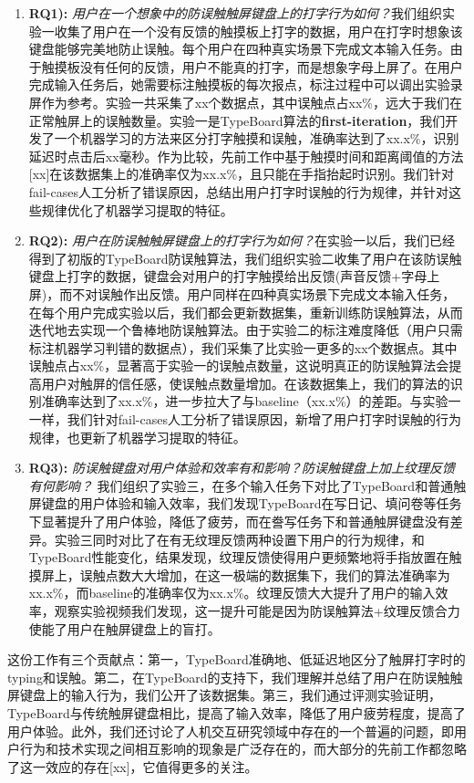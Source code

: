 \begin{enumerate}
	\item{\textbf{RQ1):} \emph{用户在一个想象中的防误触触屏键盘上的打字行为如何？}我们组织实验一收集了用户在一个没有反馈的触摸板上打字的数据，用户在打字时想象该键盘能够完美地防止误触。每个用户在四种真实场景下完成文本输入任务。由于触摸板没有任何的反馈，用户不能真的打字，而是想象字母上屏了。在用户完成输入任务后，她需要标注触摸板的每次报点，标注过程中可以调出实验录屏作为参考。实验一共采集了xx个数据点，其中误触点占xx\%，远大于我们在正常触屏上的误触数量。实验一是TypeBoard算法的\textbf{first-iteration}，我们开发了一个机器学习的方法来区分打字触摸和误触，准确率达到了xx.x\%，识别延迟时点击后xx毫秒。作为比较，先前工作中基于触摸时间和距离阈值的方法[xx]在该数据集上的准确率仅为xx.x\%，且只能在手指抬起时识别。我们针对fail-cases人工分析了错误原因，总结出用户打字时误触的行为规律，并针对这些规律优化了机器学习提取的特征。}
	\item{\textbf{RQ2):} \emph{用户在防误触触屏键盘上的打字行为如何？}在实验一以后，我们已经得到了初版的TypeBoard防误触算法，我们组织实验二收集了用户在该防误触键盘上打字的数据，键盘会对用户的打字触摸给出反馈(声音反馈+字母上屏)，而不对误触作出反馈。用户同样在四种真实场景下完成文本输入任务，在每个用户完成实验以后，我们都会更新数据集，重新训练防误触算法，从而迭代地去实现一个鲁棒地防误触算法。由于实验二的标注难度降低（用户只需标注机器学习判错的数据点），我们采集了比实验一更多的xx个数据点。其中误触点占xx\%，显著高于实验一的误触点数量，这说明真正的防误触算法会提高用户对触屏的信任感，使误触点数量增加。在该数据集上，我们的算法的识别准确率达到了xx.x\%，进一步拉大了与baseline（xx.x\%）的差距。与实验一一样，我们针对fail-cases人工分析了错误原因，新增了用户打字时误触的行为规律，也更新了机器学习提取的特征。}
	\item{\textbf{RQ3):} \emph{防误触键盘对用户体验和效率有和影响？防误触键盘上加上纹理反馈有何影响？} 我们组织了实验三，在多个输入任务下对比了TypeBoard和普通触屏键盘的用户体验和输入效率，我们发现TypeBoard在写日记、填问卷等任务下显著提升了用户体验，降低了疲劳，而在誊写任务下和普通触屏键盘没有差异。实验三同时对比了在有无纹理反馈两种设置下用户的行为规律，和TypeBoard性能变化，结果发现，纹理反馈使得用户更频繁地将手指放置在触摸屏上，误触点数大大增加，在这一极端的数据集下，我们的算法准确率为xx.x\%，而baseline的准确率仅为xx.x\%。纹理反馈大大提升了用户的输入效率，观察实验视频我们发现，这一提升可能是因为防误触算法+纹理反馈合力使能了用户在触屏键盘上的盲打。}
\end{enumerate}

这份工作有三个贡献点：第一，TypeBoard准确地、低延迟地区分了触屏打字时的typing和误触。第二，在TypeBoard的支持下，我们理解并总结了用户在防误触触屏键盘上的输入行为，我们公开了该数据集。第三，我们通过评测实验证明，TypeBoard与传统触屏键盘相比，提高了输入效率，降低了用户疲劳程度，提高了用户体验。此外，我们还讨论了人机交互研究领域中存在的一个普遍的问题，即用户行为和技术实现之间相互影响的现象是广泛存在的，而大部分的先前工作都忽略了这一效应的存在[xx]，它值得更多的关注。
